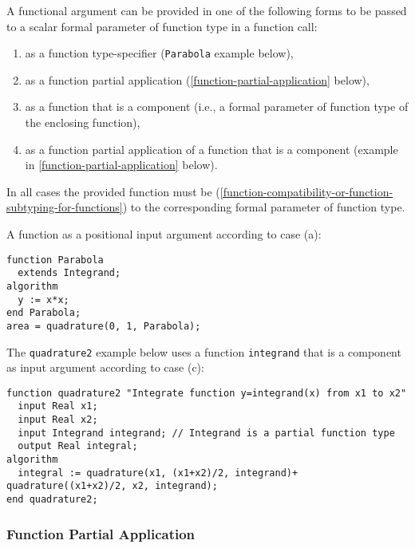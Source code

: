 A functional argument can be provided in one of the following forms to
be passed to a scalar formal parameter of function type in a function
call:
\begin{enumerate}
\def\labelenumi{\alph{enumi})}
\item
  as a function type-specifier (\lstinline!Parabola! example below),
\item
  as a function partial application (\autoref{function-partial-application} below),
\item
  as a function that is a component (i.e., a formal parameter of function type of the enclosing function),
\item
  as a function partial application of a function that is a component
  (example in \autoref{function-partial-application} below).
\end{enumerate}

In all cases the provided function must be 
(\autoref{function-compatibility-or-function-subtyping-for-functions}) to the corresponding formal parameter of function type.

\begin{example}
A function as a positional input argument according to case (a):
\begin{lstlisting}[language=modelica]
function Parabola
  extends Integrand;
algorithm
  y := x*x;
end Parabola;
area = quadrature(0, 1, Parabola);
\end{lstlisting}
The \lstinline!quadrature2! example below uses a function \lstinline!integrand! that is a
component as input argument according to case (c):
\begin{lstlisting}[language=modelica]
  function quadrature2 "Integrate function y=integrand(x) from x1 to x2"
  input Real x1;
  input Real x2;
  input Integrand integrand; // Integrand is a partial function type
  output Real integral;
algorithm
  integral := quadrature(x1, (x1+x2)/2, integrand)+  quadrature((x1+x2)/2, x2, integrand);
end quadrature2;
\end{lstlisting}
\end{example}

\subsubsection{Function Partial Application}

